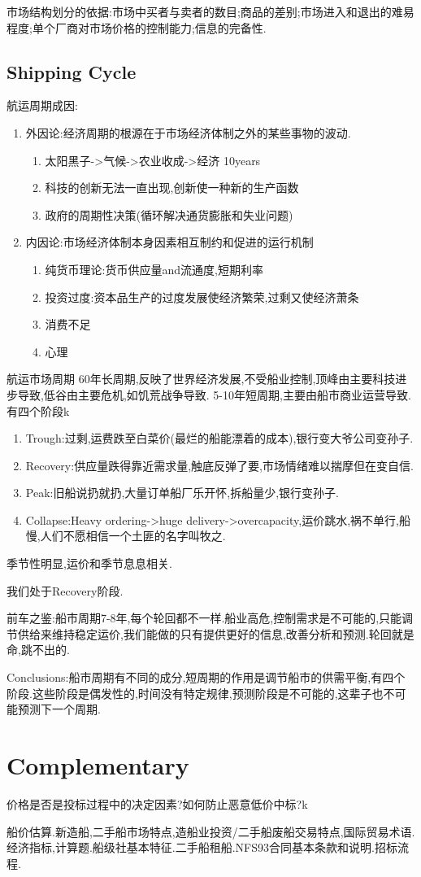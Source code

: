 \documentclass[UTF8,a4paper]{ctexart}
\begin{document}
			市场结构划分的依据:市场中买者与卖者的数目;商品的差别;市场进入和退出的难易程度;单个厂商对市场价格的控制能力;信息的完备性.
		\subsection{Shipping Cycle}
			航运周期成因:
				\begin{enumerate}[1)]
					\item 外因论:经济周期的根源在于市场经济体制之外的某些事物的波动.
						\begin{enumerate}[.]
							\item 太阳黑子->气候->农业收成->经济 10years
							\item 科技的创新无法一直出现,创新使一种新的生产函数
							\item 政府的周期性决策(循环解决通货膨胀和失业问题)
						\end{enumerate}
					\item 内因论:市场经济体制本身因素相互制约和促进的运行机制
						\begin{enumerate}[.]
							\item 纯货币理论:货币供应量and流通度,短期利率
							\item 投资过度:资本品生产的过度发展使经济繁荣,过剩又使经济萧条
							\item 消费不足
							\item 心理
						\end{enumerate}
				\end{enumerate}
			航运市场周期
			60年长周期,反映了世界经济发展,不受船业控制,顶峰由主要科技进步导致,低谷由主要危机,如饥荒战争导致.
			5-10年短周期,主要由船市商业运营导致.有四个阶段k
				\begin{enumerate}[(1)]
					\item Trough:过剩,运费跌至白菜价(最烂的船能漂着的成本),银行变大爷公司变孙子.
					\item Recovery:供应量跌得靠近需求量,触底反弹了要,市场情绪难以揣摩但在变自信.
					\item Peak:旧船说扔就扔,大量订单船厂乐开怀,拆船量少,银行变孙子.
					\item Collapse:Heavy ordering->huge delivery->overcapacity,运价跳水,祸不单行,船慢,人们不愿相信一个土匪的名字叫牧之.
				\end{enumerate}
			
			季节性明显,运价和季节息息相关.
			
			我们处于Recovery阶段.
			
			前车之鉴:船市周期7-8年,每个轮回都不一样.船业高危,控制需求是不可能的,只能调节供给来维持稳定运价,我们能做的只有提供更好的信息,改善分析和预测.轮回就是命,跳不出的.
			
			Conclusions:船市周期有不同的成分,短周期的作用是调节船市的供需平衡,有四个阶段.这些阶段是偶发性的,时间没有特定规律,预测阶段是不可能的,这辈子也不可能预测下一个周期.
			
	\section{Complementary}
		
		价格是否是投标过程中的决定因素?如何防止恶意低价中标?k
	
		
		船价估算.新造船,二手船市场特点,造船业投资/二手船废船交易特点,国际贸易术语.经济指标,计算题.船级社基本特征.二手船租船.NFS93合同基本条款和说明.招标流程.
\end{document}
